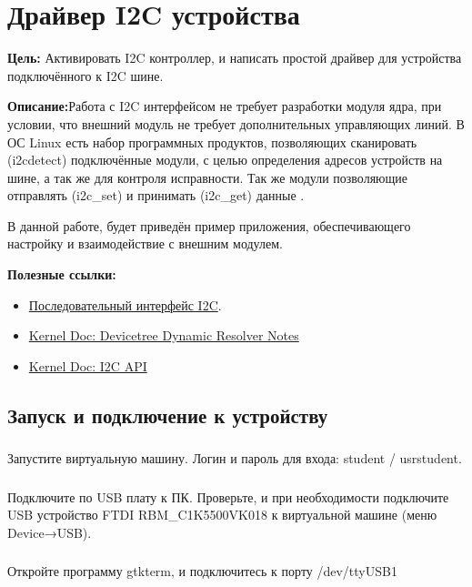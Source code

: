 \chapter{Драйвер I2C устройства}
\textbf{Цель:} Активировать I2C контроллер, и написать простой драйвер для устройства подключённого к I2C шине.

\vspace{5mm}
\textbf{Описание:}Работа с I2C интерфейсом не требует разработки модуля ядра, при условии, что внешний модуль не требует дополнительных управляющих линий. В ОС Linux есть набор программных продуктов, позволяющих сканировать (i2cdetect) подключённые модули, с целью определения адресов устройств на шине, а так же для контроля исправности. Так же модули позволяющие отправлять (i2c\_set) и принимать (i2c\_get) данные .

В данной работе, будет приведён пример приложения, обеспечивающего настройку и взаимодействие с внешним модулем. 

\vspace{5mm}
\textbf{Полезные ссылки:}
\begin{itemize}
	\item \href{http://www.gaw.ru/html.cgi/txt/interface/iic/start.htm}{Последовательный интерфейс I2C}.
	\item \href{https://docs.kernel.org/devicetree/dynamic-resolution-notes.html}{Kernel Doc: Devicetree Dynamic Resolver Notes}
	\item \href{https://www.kernel.org/doc/html/v4.15/driver-api/i2c.html}{Kernel Doc: I2C API}	
\end{itemize}

\section{Запуск и подключение к устройству}

\subsection{}Запустите виртуальную машину. Логин и пароль для входа: student / usrstudent.

\subsection{}Подключите по USB плату к ПК. Проверьте, и при необходимости подключите USB устройство FTDI RBM\_C1K5500VK018 к виртуальной машине (меню Device→USB).

\subsection{}Откройте программу gtkterm, и подключитесь к порту /dev/ttyUSB1

